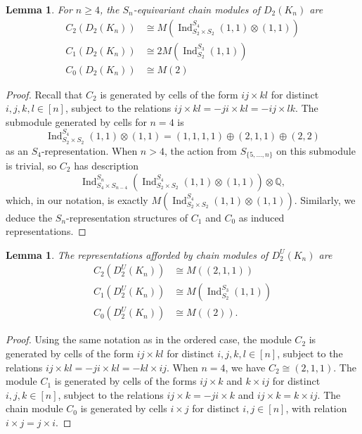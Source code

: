 \documentclass[12pt]{amsart}
\newtheorem{lem}[thm]{Lemma}
\theoremstyle{definition}
\newcommand{\Q}{\mathbb{Q}}
\newcommand{\ind}{\operatorname{Ind}}
\begin{document}
\begin{lem}
For $n\geq 4$, the $S_n$-equivariant chain modules of $D_2(K_n)$ are
\begin{align*}
C_2(D_2(K_n)) &\cong M(\ind_{S_2\times S_2}^{S_4} (1,1) \otimes (1,1)) \\
C_1(D_2(K_n)) &\cong 2M(\ind_{S_2}^{S_3} (1,1)) \\
C_0(D_2(K_n)) &\cong M(2) 
\end{align*}
\end{lem}

\begin{proof}
Recall that $C_2$ is generated by cells of the form ${ij}\times{kl}$ for distinct $i,j,k,l\in[n]$, subject to the relations ${ij}\times{kl} = -{ji}\times{kl} = -{ij}\times{lk}$. The submodule generated by cells for $n=4$ is \[\ind_{S_2\times S_2}^{S_4}(1,1)\otimes (1,1) = (1,1,1,1)\oplus (2,1,1)\oplus (2,2)\] as an $S_4$-representation. When $n>4$, the action from $S_{\{5,\dots,n\}}$ on this submodule is trivial, so $C_2$ has description \[\ind_{S_4\times S_{n-4}}^{S_n}(\ind_{S_2\times S_2}^{S_4}(1,1)\otimes (1,1))\otimes \Q,\] which, in our notation, is exactly $M(\ind_{S_2\times S_2}^{S_4}(1,1)\otimes (1,1))$. Similarly, we deduce the $S_n$-representation structures of $C_1$ and $C_0$ as induced representations.
\end{proof}

\begin{lem}
The representations afforded by chain modules of $D^U_2(K_n)$ are
\begin{align*}
    C_2(D^U_2(K_n)) &\cong M((2,1,1)) \\
    C_1(D^U_2(K_n)) &\cong M(\ind_{S_2}^{S_3}(1,1))\\
    C_0(D^U_2(K_n)) &\cong M((2)).
\end{align*}   
\end{lem}

\begin{proof}
Using the same notation as in the ordered case, the module $C_2$ is generated by cells of the form ${ij}\times{kl}$ for distinct $i,j,k,l\in [n]$, subject to the relations ${ij}\times {kl} = -{ji}\times {kl}=-{kl}\times {ij}$. When $n=4$, we have $C_2 \cong (2,1,1)$. The module $C_1$ is generated by cells of the forms ${ij}\times k$ and $k\times {ij}$ for distinct $i,j,k\in[n]$, subject to the relations ${ij}\times k = -{ji}\times k$ and ${ij}\times k = k\times {ij}$. The chain module $C_0$ is generated by cells $i \times j$ for distinct $i,j\in [n]$, with relation $i \times j=j\times i$.
\end{proof}
\end{document}
